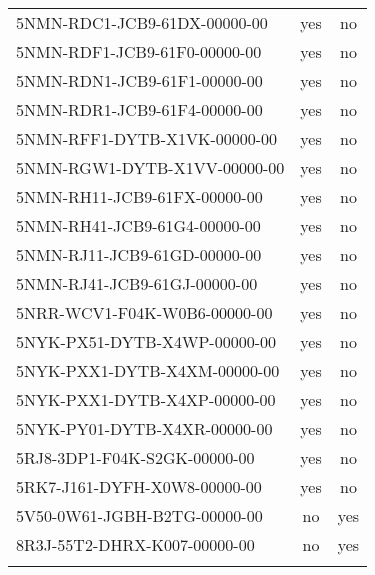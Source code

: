 \documentclass[10pt, letterpaper]{article}
\begin{document}
\begin{spacing}{1.0}
\begin{table}[H]
\begin{tabular}{p{2.5in}cc}
        5NMN-RDC1-JCB9-61DX-00000-00 & yes & no\\
        5NMN-RDF1-JCB9-61F0-00000-00 & yes & no\\
        5NMN-RDN1-JCB9-61F1-00000-00 & yes & no\\
        5NMN-RDR1-JCB9-61F4-00000-00 & yes & no\\
        5NMN-RFF1-DYTB-X1VK-00000-00 & yes & no\\
        5NMN-RGW1-DYTB-X1VV-00000-00 & yes & no\\
        5NMN-RH11-JCB9-61FX-00000-00 & yes & no\\
        5NMN-RH41-JCB9-61G4-00000-00 & yes & no\\
        5NMN-RJ11-JCB9-61GD-00000-00 & yes & no\\
        5NMN-RJ41-JCB9-61GJ-00000-00 & yes & no\\
        5NRR-WCV1-F04K-W0B6-00000-00 & yes & no\\
        5NYK-PX51-DYTB-X4WP-00000-00 & yes & no\\
        5NYK-PXX1-DYTB-X4XM-00000-00 & yes & no\\
        5NYK-PXX1-DYTB-X4XP-00000-00 & yes & no\\
        5NYK-PY01-DYTB-X4XR-00000-00 & yes & no\\
        5RJ8-3DP1-F04K-S2GK-00000-00 & yes & no\\
        5RK7-J161-DYFH-X0W8-00000-00 & yes & no\\
        5V50-0W61-JGBH-B2TG-00000-00 & no & yes\\
        8R3J-55T2-DHRX-K007-00000-00 & no & yes\\[4pt]
        \hline\\
    \end{tabular}
    \label{tab:emptyCourtName}
\end{table}


\end{spacing}
\end{document}
